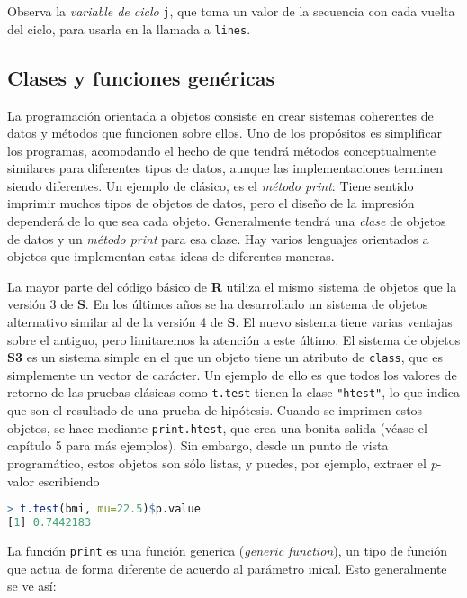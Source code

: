 Observa la \textit{variable de ciclo} \texttt{j}, que toma un valor de la
secuencia con cada vuelta del ciclo, para usarla en la llamada a \texttt{lines}.

\subsection{Clases y funciones genéricas}

La programación orientada a objetos consiste en crear sistemas coherentes de
datos y métodos que funcionen sobre ellos. Uno de los propósitos es simplificar
los programas, acomodando el hecho de que tendrá métodos conceptualmente
similares para diferentes tipos de datos, aunque las implementaciones terminen
siendo diferentes. Un ejemplo de clásico, es el \textit{método print}: Tiene
sentido imprimir muchos tipos de objetos de datos, pero el diseño de la
impresión dependerá de lo que sea cada objeto. Generalmente tendrá una
\textit{clase} de objetos de datos y un \textit{método print} para esa clase.
Hay varios lenguajes orientados a objetos que implementan estas ideas de
diferentes maneras.

La mayor parte del código básico de \textbf{R} utiliza el mismo sistema de
objetos que la versión 3 de \textbf{S}. En los últimos años se ha desarrollado
un sistema de objetos alternativo similar al de la versión 4 de \textbf{S}. El
nuevo sistema tiene varias ventajas sobre el antiguo, pero limitaremos la
atención a este último. El sistema de objetos \textbf{S3} es un sistema simple
en el que un objeto tiene un atributo de \texttt{class}, que es simplemente un
vector de carácter. Un ejemplo de ello es que todos los valores de retorno de
las pruebas clásicas como \texttt{t.test} tienen la clase \texttt{"htest"}, lo
que indica que son el resultado de una prueba de hipótesis. Cuando se imprimen
estos objetos, se hace mediante \texttt{print.htest}, que crea una bonita salida
(véase el capítulo 5 para más ejemplos). Sin embargo, desde un punto de vista
programático, estos objetos son sólo listas, y puedes, por ejemplo, extraer el
\textit{p}-valor escribiendo

\begin{lstlisting}[language=R]
> t.test(bmi, mu=22.5)$p.value
[1] 0.7442183
\end{lstlisting}

La función \texttt{print} es una función generica (\textit{generic function}),
un tipo de función que actua de forma diferente de acuerdo al parámetro inical.
Esto generalmente se ve así:

